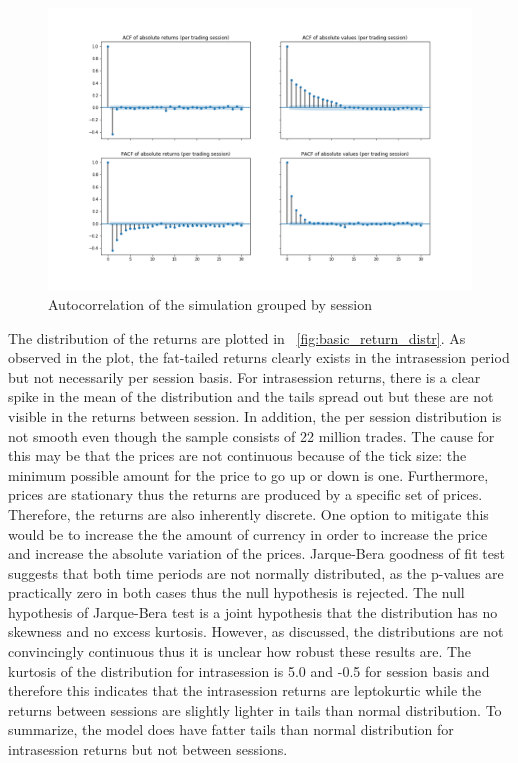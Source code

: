 \begin{figure}
    \includegraphics[width=\linewidth]{plots/basic_autocorrelation.png}
    \caption{Autocorrelation of the simulation grouped by session}
    \label{fig:basic_autocorr_per_session}
\end{figure}


The distribution of the returns are plotted in ~\ref{fig:basic_return_distr}. As observed in the plot, the fat-tailed returns
clearly exists in the intrasession period but not necessarily per session basis. For intrasession returns, there is a clear spike in the mean of the 
distribution and the tails spread out but these are not visible in the returns between session. In addition, the per session distribution
is not smooth even though the sample consists of 22 million trades. The cause for this may be that the prices are not 
continuous because of the tick size: the minimum possible amount for the price to go up or down is one. Furthermore, prices are
stationary thus the returns are produced by a specific set of prices. Therefore, the returns are also inherently discrete. One option
to mitigate this would be to increase the the amount of currency in order to increase the price and increase the absolute
variation of the prices. Jarque-Bera goodness of fit test suggests that both time periods are not normally distributed,
as the p-values are practically zero in both cases thus the null hypothesis is rejected. The null hypothesis of Jarque-Bera test 
is a joint hypothesis that the distribution has no skewness and no excess kurtosis. However, as discussed, the distributions are not 
convincingly continuous thus it is unclear how robust these results are. The kurtosis of the distribution for intrasession is 5.0 
and -0.5 for session basis and therefore this indicates that the intrasession returns are leptokurtic while the returns between 
sessions are slightly lighter in tails than normal distribution. To summarize, the model does have fatter tails than normal distribution
for intrasession returns but not between sessions. 


